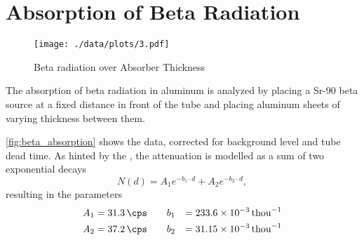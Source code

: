 \chapter{Absorption of Beta Radiation}

\begin{figure}[ht!]
	\centering
	\texttt{[image: ./data/plots/3.pdf]}
	\caption{Beta radiation over Absorber Thickness}
	\label{fig:beta_absorption}
\end{figure}

The absorption of beta radiation in aluminum is analyzed by placing a Sr-90 beta source at a fixed distance in front of the tube and placing aluminum sheets of varying thickness between them.

\autoref{fig:beta_absorption} shows the data, corrected for background level and tube dead time.
As hinted by the , the attenuation is modelled as a sum of two exponential decays
\begin{equation*}
	N(d) = A_1 e^{-b_1 \cdot d} + A_2 e^{-b_2 \cdot d},
\end{equation*}
resulting in the parameters
\begin{alignat*}{2}
	A_1 &= \SI{31.3}{\cps} \qquad b_1 &= \SI{233.6e-3}{thou^{-1}}\\
	A_2 &= \SI{37.2}{\cps} \qquad b_2 &= \SI{31.15e-3}{thou^{-1}}
\end{alignat*}

